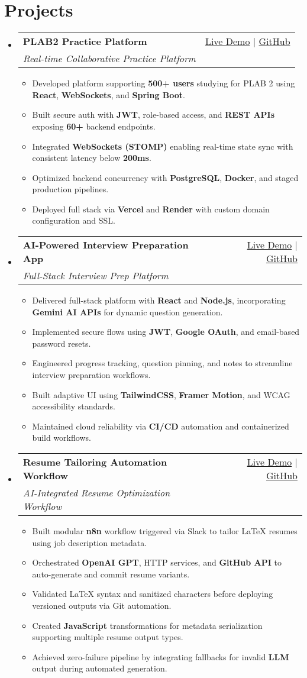 \documentclass[letterpaper,11pt]{article}
\makeatletter
\newcommand{\resumeItem}[1]{\item\small{#1 \vspace{-2pt}}}
\newcommand{\resumeSubheading}[4]{
  \vspace{-1pt}\item
    \begin{tabular*}{0.97\textwidth}[t]{l@{\extracolsep{\fill}}r}
      \textbf{#1} & #2 \\
      \textit{\small#3} & \textit{\small #4} \\
    \end{tabular*}\vspace{-5pt}
}
\newcommand{\resumeSubHeadingListStart}{\begin{itemize}[leftmargin=*]}
\newcommand{\resumeSubHeadingListEnd}{\end{itemize}}
\newcommand{\resumeItemListStart}{\begin{itemize}}
\newcommand{\resumeItemListEnd}{\end{itemize}\vspace{-5pt}}
\makeatother
\begin{document}
\section{Projects}
  \resumeSubHeadingListStart
    \resumeSubheading
      {\textbf{PLAB2 Practice Platform}}{\href{https://plab2practice.com}{Live Demo} | \href{https://github.com/altansaid/plab2projectnew}{GitHub}}
      {Real-time Collaborative Practice Platform}{}
      \resumeItemListStart
        \resumeItem{Developed platform supporting \textbf{500+ users} studying for PLAB 2 using \textbf{React}, \textbf{WebSockets}, and \textbf{Spring Boot}.}
        \resumeItem{Built secure auth with \textbf{JWT}, role-based access, and \textbf{REST APIs} exposing \textbf{60+} backend endpoints.}
        \resumeItem{Integrated \textbf{WebSockets (STOMP)} enabling real-time state sync with consistent latency below \textbf{200ms}.}
        \resumeItem{Optimized backend concurrency with \textbf{PostgreSQL}, \textbf{Docker}, and staged production pipelines.}
        \resumeItem{Deployed full stack via \textbf{Vercel} and \textbf{Render} with custom domain configuration and SSL.}
      \resumeItemListEnd

    \resumeSubheading
      {\textbf{AI-Powered Interview Preparation App}}{\href{https://interviewcoach-ai.vercel.app}{Live Demo} | \href{https://github.com/altansaid/interviewcoach-ai}{GitHub}}
      {Full-Stack Interview Prep Platform}{}
      \resumeItemListStart
        \resumeItem{Delivered full-stack platform with \textbf{React} and \textbf{Node.js}, incorporating \textbf{Gemini AI APIs} for dynamic question generation.}
        \resumeItem{Implemented secure flows using \textbf{JWT}, \textbf{Google OAuth}, and email-based password resets.}
        \resumeItem{Engineered progress tracking, question pinning, and notes to streamline interview preparation workflows.}
        \resumeItem{Built adaptive UI using \textbf{TailwindCSS}, \textbf{Framer Motion}, and WCAG accessibility standards.}
        \resumeItem{Maintained cloud reliability via \textbf{CI/CD} automation and containerized build workflows.}
      \resumeItemListEnd

    \resumeSubheading
      {\textbf{Resume Tailoring Automation Workflow}}{\href{}{Live Demo} | \href{https://github.com/altansaid/resume-updates}{GitHub}}
      {AI-Integrated Resume Optimization Workflow}{}
      \resumeItemListStart
        \resumeItem{Built modular \textbf{n8n} workflow triggered via Slack to tailor \LaTeX{} resumes using job description metadata.}
        \resumeItem{Orchestrated \textbf{OpenAI GPT}, HTTP services, and \textbf{GitHub API} to auto-generate and commit resume variants.}
        \resumeItem{Validated \LaTeX{} syntax and sanitized characters before deploying versioned outputs via Git automation.}
        \resumeItem{Created \textbf{JavaScript} transformations for metadata serialization supporting multiple resume output types.}
        \resumeItem{Achieved zero-failure pipeline by integrating fallbacks for invalid \textbf{LLM} output during automated generation.}
      \resumeItemListEnd
  \resumeSubHeadingListEnd
\end{document}
